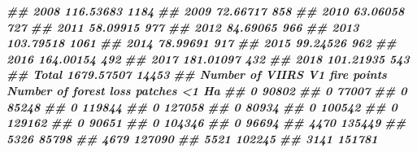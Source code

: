 \documentclass[10pt,landscape,a3paper]{article}
\newenvironment{Shaded}{\begin{snugshade}}{\end{snugshade}}
\newcommand{\DocumentationTok}[1]{\textcolor[rgb]{0.56,0.35,0.01}{\textbf{\textit{#1}}}}
\begin{document}
\begin{Shaded}
\begin{Highlighting}[]
\DocumentationTok{\#\#   2008                     116.53683                           1184}
\DocumentationTok{\#\#   2009                      72.66717                            858}
\DocumentationTok{\#\#   2010                      63.06058                            727}
\DocumentationTok{\#\#   2011                      58.09915                            977}
\DocumentationTok{\#\#   2012                      84.69065                            966}
\DocumentationTok{\#\#   2013                     103.79518                           1061}
\DocumentationTok{\#\#   2014                      78.99691                            917}
\DocumentationTok{\#\#   2015                      99.24526                            962}
\DocumentationTok{\#\#   2016                     164.00154                            492}
\DocumentationTok{\#\#   2017                     181.01097                            432}
\DocumentationTok{\#\#   2018                     101.21935                            543}
\DocumentationTok{\#\#  Total                    1679.57507                          14453}
\DocumentationTok{\#\#  Number of VIIRS V1 fire points Number of forest loss patches \textless{}1 Ha}
\DocumentationTok{\#\#                               0                               90802}
\DocumentationTok{\#\#                               0                               77007}
\DocumentationTok{\#\#                               0                               85248}
\DocumentationTok{\#\#                               0                              119844}
\DocumentationTok{\#\#                               0                              127058}
\DocumentationTok{\#\#                               0                               80934}
\DocumentationTok{\#\#                               0                              100542}
\DocumentationTok{\#\#                               0                              129162}
\DocumentationTok{\#\#                               0                               90651}
\DocumentationTok{\#\#                               0                              104346}
\DocumentationTok{\#\#                               0                               96694}
\DocumentationTok{\#\#                            4470                              135449}
\DocumentationTok{\#\#                            5326                               85798}
\DocumentationTok{\#\#                            4679                              127090}
\DocumentationTok{\#\#                            5521                              102245}
\DocumentationTok{\#\#                            3141                              151781}

\end{Highlighting}
\end{Shaded}
\end{document}
